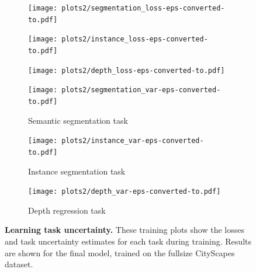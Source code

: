 \begin{figure}[t]
\begin{center}
\begin{subfigure}[t]{0.32\linewidth}
\begin{center}
  \texttt{[image: plots2/segmentation\_loss-eps-converted-to.pdf]}
\end{center}
\end{subfigure}
\begin{subfigure}[t]{0.32\linewidth}
\begin{center}
  \texttt{[image: plots2/instance\_loss-eps-converted-to.pdf]}
\end{center}
\end{subfigure}
\begin{subfigure}[t]{0.32\linewidth}
\begin{center}
  \texttt{[image: plots2/depth\_loss-eps-converted-to.pdf]}
\end{center}
\end{subfigure}


\begin{subfigure}[t]{0.32\linewidth}
\begin{center}
  \texttt{[image: plots2/segmentation\_var-eps-converted-to.pdf]}
  \caption{Semantic segmentation task}
\end{center}
\end{subfigure}
\begin{subfigure}[t]{0.32\linewidth}
\begin{center}
  \texttt{[image: plots2/instance\_var-eps-converted-to.pdf]}
  \caption{Instance segmentation task}
\end{center}
\end{subfigure}
\begin{subfigure}[t]{0.32\linewidth}
\begin{center}
  \texttt{[image: plots2/depth\_var-eps-converted-to.pdf]}
  \caption{Depth regression task}
\end{center}
\end{subfigure}
\end{center}
   \caption[Learning task uncertainty.]{\textbf{Learning task uncertainty.} These training plots show the losses and task uncertainty estimates for each task during training. Results are shown for the final model, trained on the fullsize CityScapes dataset.}
\label{fig:taskunc}
\end{figure}


